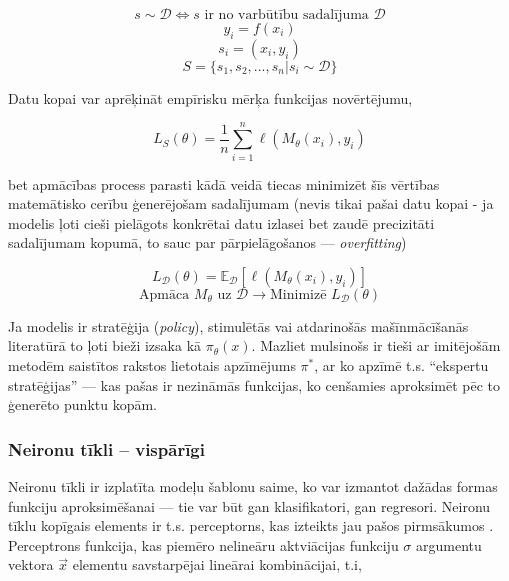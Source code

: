 \documentclass[12pt, a4paper]{article}
\numberwithin{equation}{section} %
\begin{document}
\begin{equation} 
    s \sim \mathcal{D} \Leftrightarrow s \text{ ir no varbūtību sadalījuma } \mathcal{D}
\end{equation}
\begin{equation} 
    y_i = f(x_i)
\end{equation}
\begin{equation} 
    s_i = (x_i, y_i)
\end{equation}
\begin{equation} 
    S = \lbrace s_1, s_2, ..., s_n \vert s_i \sim \mathcal{D}\rbrace
\end{equation}

Datu kopai var aprēķināt empīrisku mērķa funkcijas novērtējumu,

\begin{equation} 
    L_S(\theta) = \frac{1}{n}\sum_{i=1}^n\ell(M_{\theta}(x_i), y_i)
\end{equation}

bet apmācības process parasti kādā veidā tiecas minimizēt šīs vērtības matemātisko cerību ģenerējošam sadalījumam (nevis tikai pašai datu kopai - ja modelis ļoti cieši pielāgots konkrētai datu izlasei bet zaudē precizitāti sadalījumam kopumā, to sauc par pārpielāgošanos --- \textit{overfitting})

\begin{equation} 
    L_{\mathcal{D}}(\theta) = \mathbb{E}_{\mathcal{D}} [\ell(M_{\theta}(x_i), y_i)]
\end{equation}
\begin{equation} 
    \text{Apmāca } M_{\theta} \text{ uz } \mathcal{D} \rightarrow \text{Minimizē } L_{\mathcal{D}}(\theta)
\end{equation}

Ja modelis ir stratēģija (\textit{policy}), stimulētās vai atdarinošās mašīnmācīšanās literatūrā to ļoti bieži izsaka kā $\pi_{\theta}(x)$. Mazliet mulsinošs ir tieši ar imitējošām metodēm saistītos rakstos lietotais apzīmējums $\pi^*$, ar ko apzīmē t.s. ``ekspertu stratēģijas'' --- kas pašas ir nezināmās funkcijas, ko cenšamies aproksimēt pēc to ģenerēto punktu kopām. 


\subsubsection{Neironu tīkli -- vispārīgi}

Neironu tīkli ir izplatīta modeļu šablonu saime, ko var izmantot dažādas formas funkciju aproksimēšanai --- tie var būt gan klasifikatori, gan regresori. Neironu tīklu kopīgais elements ir t.s. perceptorns, kas izteikts jau pašos pirmsākumos \cite{mcculloch1943logical}. Perceptrons funkcija, kas piemēro nelineāru aktviācijas funkciju $\sigma$ argumentu vektora $\vec{x}$ elementu savstarpējai lineārai kombinācijai, t.i,
\end{document}
